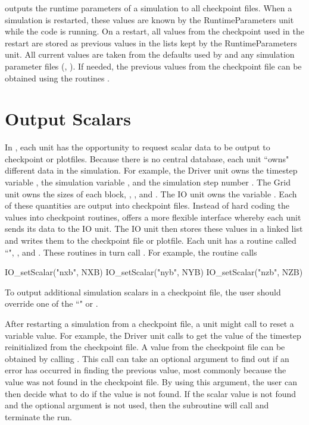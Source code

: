 \flashx outputs the runtime parameters of a simulation to all checkpoint files.
When a simulation is restarted, these values are known by the \unit{RuntimeParameters} unit while
the code is running.  On a restart, all values from the checkpoint used in the
restart are stored as previous values in the lists kept by the
\unit{RuntimeParameters} unit.  All current values are taken from the
defaults used by \flashx and any simulation parameter files (\eg, ).  If needed, the previous
values from the checkpoint file can be obtained using the routines 
.

\section{Output Scalars}\label{Sec:output scalars}

In \flashx, each unit has the opportunity to request scalar data to be
output to checkpoint or plotfiles.  Because there is no central
database, each unit ``owns" different data in the
simulation. For example, the \unit{Driver} unit owns the timestep variable
, the simulation variable , and the simulation
step number .  The \unit{Grid} unit owns the sizes of each
block, , , and .  The \unit{IO} unit owns
the variable .  Each of these
quantities are output into checkpoint files. Instead of hard coding the values into
checkpoint routines, \flashx offers a more flexible interface whereby
each unit sends its data to the \unit{IO} unit.  The \unit{IO} unit then stores
these values in a linked list and writes them to the checkpoint file or
plotfile.  Each unit has a routine called ``", \eg,
 and
. These routines in turn call
.  For example, the routine
 calls

\begin{codeseg}
 IO_setScalar("nxb", NXB)
 IO_setScalar("nyb", NYB)
 IO_setScalar("nzb", NZB)
\end{codeseg}

To output additional simulation scalars in a checkpoint file, the user should 
override one of the ``" or 
.

After restarting a simulation from a checkpoint file, a unit might
call  to reset a variable value.  For example,
the \unit{Driver} unit calls 
to get the value of the timestep  reinitialized from the
checkpoint file.  A value from the checkpoint file can be obtained by calling
.  This call can take an optional argument to find out if an
error has occurred in finding the previous value, most commonly because the value
was not found in the checkpoint file.  By using this argument, the user can then
decide what to do if the value is not found.  If the scalar value is not found 
and the optional argument is not used, then the subroutine will call  and terminate the run.



